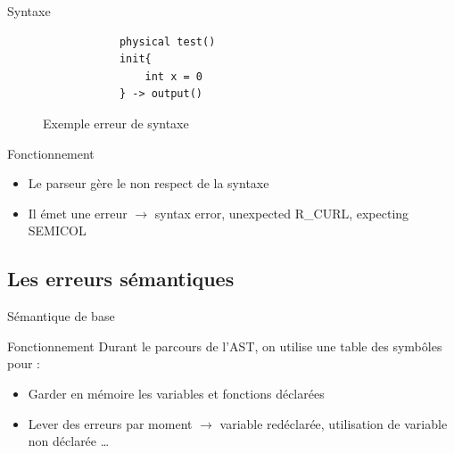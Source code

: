 \begin{frame}[fragile]{Syntaxe}

    \begin{figure}
        \centering
        \begin{verbatim}
            physical test()
            init{
                int x = 0
            } -> output()
        \end{verbatim}
        \caption{Exemple erreur de syntaxe}
    \end{figure}

    \begin{block}{Fonctionnement}
        \begin{itemize}
            \item Le parseur gère le non respect de la syntaxe
            \item Il émet une erreur $\longrightarrow$ syntax error, unexpected R\_CURL, expecting SEMICOL
        \end{itemize}
    \end{block}
\end{frame}

\subsection{Les erreurs sémantiques}

\begin{frame}{Sémantique de base}
    \begin{block}{Fonctionnement}
        Durant le parcours de l'AST, on utilise une table des symbôles pour :
        \begin{itemize}
            \item Garder en mémoire les variables et fonctions déclarées
            \item Lever des erreurs par moment $\longrightarrow$ variable redéclarée, utilisation de variable non déclarée \dots
        \end{itemize}
    \end{block}
\end{frame}

